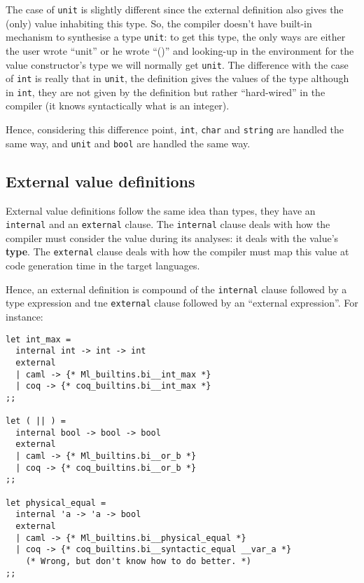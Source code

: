 The case of {\tt unit} is slightly different since the external
definition also gives the (only) value inhabiting this type. So, the
compiler doesn't have built-in mechanism to synthesise a type
{\tt unit}: to get this type, the only ways are either the user wrote
``unit'' or he wrote ``()'' and looking-up in the environment for the
value constructor's type we will normally get {\tt unit}. The
difference with the case of {\tt int} is really that in {\tt unit},
the definition gives the values of the type although in {\tt int},
they are not given by the definition but rather ``hard-wired'' in the
compiler (it knows syntactically what is an integer).

Hence, considering this difference point, {\tt int}, {\tt char} and
{\tt string} are handled the same way, and {\tt unit} and {\tt bool}
are handled the same way.



\subsection{External value definitions}
\label{external-value-definition}
External value definitions follow the same idea than types, they have
an {\tt internal} and an {\tt external} clause. The {\tt internal}
clause deals with how the compiler must consider the value during its
analyses: it deals with the value's {\bf type}. The {\tt external}
clause deals with how the compiler must map this value at code
generation time in the target languages.

Hence, an external definition is compound of the {\tt internal} clause
followed by a type expression and tne {\tt external} clause followed
by an ``external expression''. For instance:

{\footnotesize
\begin{lstlisting}[title=External value definitions]
let int_max =
  internal int -> int -> int
  external
  | caml -> {* Ml_builtins.bi__int_max *}
  | coq -> {* coq_builtins.bi__int_max *}
;;

let ( || ) =
  internal bool -> bool -> bool
  external
  | caml -> {* Ml_builtins.bi__or_b *}
  | coq -> {* coq_builtins.bi__or_b *}
;;

let physical_equal =
  internal 'a -> 'a -> bool
  external
  | caml -> {* Ml_builtins.bi__physical_equal *}
  | coq -> {* coq_builtins.bi__syntactic_equal __var_a *}
    (* Wrong, but don't know how to do better. *)
;;
\end{lstlisting}
}

